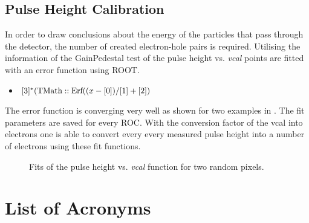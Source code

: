 \documentclass[british,11pt,a4paper]{memoir}
\begin{document}
\section{Pulse Height Calibration}\label{spulseheight}
In order to draw conclusions about the energy of the particles that pass through the detector, the number of created electron-hole pairs is required. Utilising the information of the GainPedestal test of  the pulse height vs. \textit{vcal} points are fitted with an error function using ROOT.
\begin{itemize}
	\item[] $[3]^{*}(\text{TMath}::\text{Erf}((x-[0])/[1]+[2])$
\end{itemize}
The error function is converging very well as shown for two examples in . The fit parameters are saved for every \ac{ROC}. With the conversion factor of the vcal into electrons one is able to convert every every measured pulse height into a number of electrons using these fit functions.
\begin{figure}[ht]
	\centering
	\hfill
	\caption{Fits of the pulse height vs. \textit{vcal} function for two random pixels.}
	\label{perrfit}
\end{figure}\no
\chapter*{List of Acronyms}


% 
\end{document}
